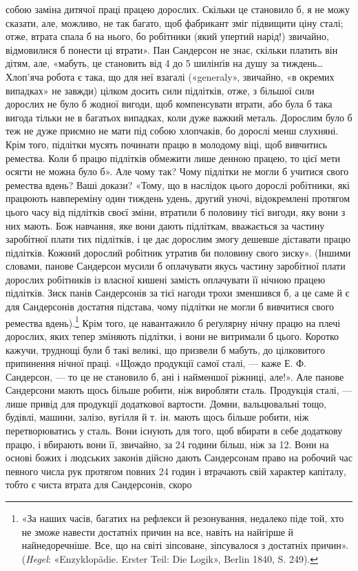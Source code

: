 \parcont{}  %
собою заміна дитячої праці працею дорослих. Скільки це становило
б, я не можу сказати, але, можливо, не так багато, щоб фабрикант
зміг підвищити ціну сталі; отже, втрата спала б на нього,
бо робітники (який упертий нарід!) звичайно, відмовилися б
понести ці втрати». Пан Сандерсон не знає, скільки платить він
дітям, але, «мабуть, це становить від 4 до 5 шилінґів на душу за
тиждень\dots{} Хлоп’яча робота є така, що для неї взагалі («generaly»,
звичайно, «в окремих випадках» не завжди) цілком досить
сили підлітків, отже, з більшої сили дорослих не було б жодної
вигоди, щоб компенсувати втрати, або була б така вигода тільки
не в багатьох випадках, коли дуже важкий металь. Дорослим
було б теж не дуже приємно не мати під собою хлопчаків, бо дорослі
менш слухняні. Крім того, підлітки мусять починати працю
в молодому віці, щоб вивчитись ремества. Коли б працю підлітків
обмежити лише денною працею, то цієї мети осягти не можна
було б». Але чому так? Чому підлітки не могли б учитися свого
ремества вдень? Ваші докази? «Тому, що в наслідок цього дорослі
робітники, які працюють навпереміну один тиждень удень,
другий уночі, відокремлені протягом цього часу від підлітків
своєї зміни, втратили б половину тієї вигоди, яку вони з них
мають. Бож навчання, яке вони дають підліткам, вважається за
частину заробітної плати тих підлітків, і це дає дорослим змогу
дешевше діставати працю підлітків. Кожний дорослий робітник
утратив би половину свого зиску». (Іншими словами, панове
Сандерсон мусили б оплачувати якусь частину заробітної плати
дорослих робітників із власної кишені замість оплачувати її
нічною працею підлітків. Зиск панів Сандерсонів за тієї нагоди
трохи зменшився б, а це саме й є для Сандерсонів достатня підстава,
чому підлітки не могли б вивчитися свого ремества вдень).\footnote{
«За наших часів, багатих на рефлекси й резонування, недалеко
піде той, хто не зможе навести достатніх причин на все, навіть на найгірше
й найнедоречніше. Все, що на світі зіпсоване, зіпсувалося з достатніх
причин». (\emph{Hegel}: «Enzyklopädie. Erster Teil: Die Logik», Berlin
1840, S. 249).
}
Крім того, це навантажило б реґулярну нічну працю на плечі
дорослих, яких тепер зміняють підлітки, і вони не витримали б
цього. Коротко кажучи, труднощі були б такі великі, що призвели б
мабуть, до цілковитого припинення нічної праці. «Щождо продукції
самої сталі, — каже Е. Ф. Сандерсон, — то це не становило б,
ані і найменшої ріжниці, але!». Але панове Сандерсони мають
щось більше робити, ніж виробляти сталь. Продукція сталі, —
лише привід для продукції додаткової вартости. Домни, вальцювальні
тощо, будівлі, машини, залізо, вугілля й т. ін. мають
щось більше робити, ніж перетворюватись у сталь. Вони існують
для того, щоб вбирати в себе додаткову працю, і вбирають вони
її, звичайно, за 24 години більш, ніж за 12. Вони на основі божих
і людських законів дійсно дають Сандерсонам право на робочий
час певного числа рук протягом повних 24 годин і втрачають свій
характер капіталу, тобто є чиста втрата для Сандерсонів, скоро
\parbreak{}  %

